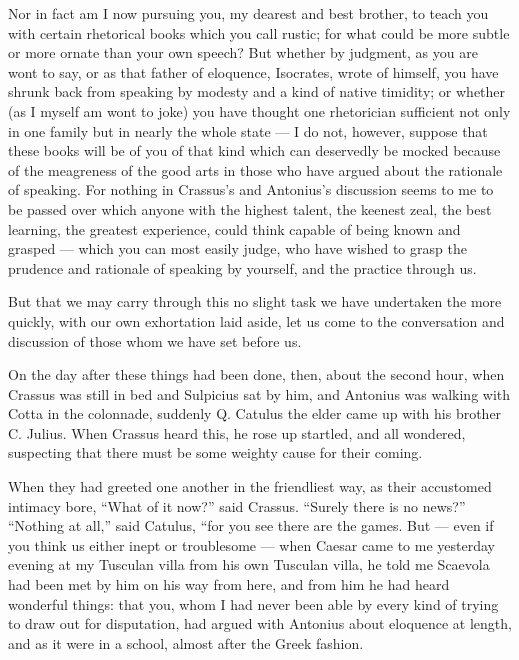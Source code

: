  Nor in fact am I now pursuing you, my dearest and best brother, to teach you with certain rhetorical books which you call rustic; for what could be more subtle or more ornate than your own speech? But whether by judgment, as you are wont to say, or as that father of eloquence, Isocrates, wrote of himself, you have shrunk back from speaking by modesty and a kind of native timidity; or whether (as I myself am wont to joke) you have thought one rhetorician sufficient not only in one family but in nearly the whole state — I do not, however, suppose that these books will be of you of that kind which can deservedly be mocked because of the meagreness of the good arts in those who have argued about the rationale of speaking. For nothing in Crassus's and Antonius's discussion seems to me to be passed over which anyone with the highest talent, the keenest zeal, the best learning, the greatest experience, could think capable of being known and grasped — which you can most easily judge, who have wished to grasp the prudence and rationale of speaking by yourself, and the practice through us.

 But that we may carry through this no slight task we have undertaken the more quickly, with our own exhortation laid aside, let us come to the conversation and discussion of those whom we have set before us.

 On the day after these things had been done, then, about the second hour, when Crassus was still in bed and Sulpicius sat by him, and Antonius was walking with Cotta in the colonnade, suddenly Q. Catulus the elder came up with his brother C. Julius. When Crassus heard this, he rose up startled, and all wondered, suspecting that there must be some weighty cause for their coming.

 When they had greeted one another in the friendliest way, as their accustomed intimacy bore, ``What of it now?'' said Crassus. ``Surely there is no news?'' ``Nothing at all,'' said Catulus, ``for you see there are the games. But — even if you think us either inept or troublesome — when Caesar came to me yesterday evening at my Tusculan villa from his own Tusculan villa, he told me Scaevola had been met by him on his way from here, and from him he had heard wonderful things: that you, whom I had never been able by every kind of trying to draw out for disputation, had argued with Antonius about eloquence at length, and as it were in a school, almost after the Greek fashion.

